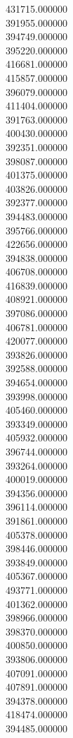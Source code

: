 431715.000000\\
391955.000000\\
394749.000000\\
395220.000000\\
416681.000000\\
415857.000000\\
396079.000000\\
411404.000000\\
391763.000000\\
400430.000000\\
392351.000000\\
398087.000000\\
401375.000000\\
403826.000000\\
392377.000000\\
394483.000000\\
395766.000000\\
422656.000000\\
394838.000000\\
406708.000000\\
416839.000000\\
408921.000000\\
397086.000000\\
406781.000000\\
420077.000000\\
393826.000000\\
392588.000000\\
394654.000000\\
393998.000000\\
405460.000000\\
393349.000000\\
405932.000000\\
396744.000000\\
393264.000000\\
400019.000000\\
394356.000000\\
396114.000000\\
391861.000000\\
405378.000000\\
398446.000000\\
393849.000000\\
405367.000000\\
493771.000000\\
401362.000000\\
398966.000000\\
398370.000000\\
400850.000000\\
393806.000000\\
407091.000000\\
407891.000000\\
394378.000000\\
418474.000000\\
394485.000000\\
